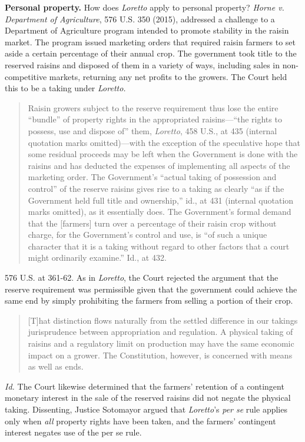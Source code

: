 \item \textbf{Personal property.} How does \textit{Loretto} apply to personal
property? \textit{Horne v. Department of Agriculture}, 576 U.S. 350 (2015),
addressed a challenge to a Department of Agriculture program intended to promote
stability in the raisin market. The program issued marketing orders that
required raisin farmers to set aside a certain percentage of their annual crop.
The government took title to the reserved raisins and disposed of them in a
variety of ways, including sales in non-competitive markets, returning any net
profits to the growers. The Court held this to be a taking under
\textit{Loretto.} 
\begin{quote}
Raisin growers subject to the reserve requirement thus lose the entire
``bundle'' of property rights in the appropriated raisins---``the rights to
possess, use and dispose of'' them, \textit{Loretto}, 458 U.S., at 435 (internal
quotation marks omitted)---with the exception of the speculative hope that some
residual proceeds may be left when the Government is done with the raisins and
has deducted the expenses of implementing all aspects of the marketing order.
The Government's ``actual taking of possession and control'' of the reserve
raisins gives rise to a taking as clearly ``as if the Government held full title
and ownership,'' id., at 431 (internal quotation marks omitted), as it
essentially does. The Government's formal demand that the [farmers] turn over a
percentage of their raisin crop without charge, for the Government's control and
use, is ``of such a unique character that it is a taking without regard to other
factors that a court might ordinarily examine.'' Id., at 432.
\end{quote}
576 U.S. at 361-62. As in \textit{Loretto}, the Court rejected the argument that
the reserve requirement was permissible given that the government could achieve
the same end by simply prohibiting the farmers from selling a portion of their
crop. 
\begin{quote}
[T]hat distinction flows naturally from the settled difference in our takings
jurisprudence between appropriation and regulation. A physical taking of raisins
and a regulatory limit on production may have the same economic impact on a
grower. The Constitution, however, is concerned with means as well as ends. 
\end{quote}
\textit{Id.} The Court likewise determined that the farmers' retention of a
contingent monetary interest in the sale of the reserved raisins did not negate
the physical taking. Dissenting, Justice Sotomayor argued that
\textit{Loretto}'s \textit{per se} rule applies only when \textit{all} property
rights have been taken, and the farmers' contingent interest negates use of the
per se rule.

